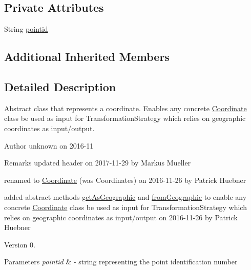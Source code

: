 \subsection*{Private Attributes}
\begin{DoxyCompactItemize}
\item 
String \hyperlink{classcoordinates_1_1_coordinate_a871c4eb3e8771b3e59f26c8e573d6aa0}{pointid}
\end{DoxyCompactItemize}
\subsection*{Additional Inherited Members}


\subsection{Detailed Description}
Abstract class that represents a coordinate. Enables any concrete \hyperlink{classcoordinates_1_1_coordinate}{Coordinate} class be used as input for Transformation\+Strategy which relies on geographic coordinates as input/output. 

\begin{DoxyAuthor}{Author}
unknown on 2016-\/11 
\end{DoxyAuthor}
\begin{DoxyRemark}{Remarks}
updated header on 2017-\/11-\/29 by Markus Mueller 

renamed to \hyperlink{classcoordinates_1_1_coordinate}{Coordinate} (was Coordinates) on 2016-\/11-\/26 by Patrick Huebner 

added abstract methods \hyperlink{classcoordinates_1_1_coordinate_a97342479914743d999cef4b38f9124ed}{get\+As\+Geographic} and \hyperlink{classcoordinates_1_1_coordinate_a7307326f53867082a66d1f96cfb1d7d0}{from\+Geographic} to enable any concrete \hyperlink{classcoordinates_1_1_coordinate}{Coordinate} class be used as input for Transformation\+Strategy which relies on geographic coordinates as input/output on 2016-\/11-\/26 by Patrick Huebner 
\end{DoxyRemark}
\begin{DoxyVersion}{Version}
0. 
\end{DoxyVersion}

\begin{DoxyParams}{Parameters}
{\em pointid} & -\/ string representing the point identification number \\
\hline
\end{DoxyParams}


